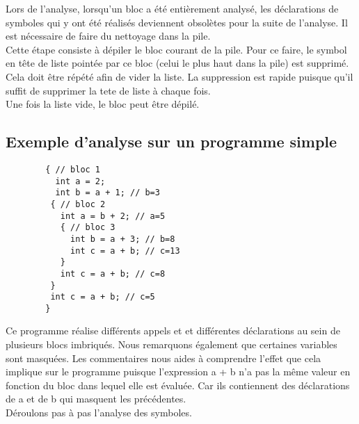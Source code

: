 \documentclass{../../res/univ-projet}
\begin{document}
      Lors de l'analyse, lorsqu'un bloc a été entièrement analysé, les déclarations de symboles qui y ont été réalisés deviennent obsolètes pour la suite de l'analyse. Il est nécessaire de faire du nettoyage dans la pile.\\

      Cette étape consiste à dépiler le bloc courant de la pile. Pour ce faire, le symbol en tête de liste pointée par ce bloc (celui le plus haut dans la pile) est supprimé. Cela doit être répété afin de vider la liste. La suppression est rapide puisque qu'il suffit de supprimer la tete de liste à chaque fois.\\
      Une fois la liste vide, le bloc peut être dépilé.

  \subsection{Exemple d'analyse sur un programme simple}
    \begin{multicols}{2}
        
        \begin{verbatim}
        { // bloc 1
          int a = 2;
          int b = a + 1; // b=3
         { // bloc 2
           int a = b + 2; // a=5
           { // bloc 3
             int b = a + 3; // b=8
             int c = a + b; // c=13
           }
           int c = a + b; // c=8
         }
         int c = a + b; // c=5
        }

        \end{verbatim}

      \columnbreak
        Ce programme réalise différents appels et et différentes déclarations au sein de plusieurs blocs imbriqués. Nous remarquons également que certaines variables sont masquées. Les commentaires nous aides à comprendre l'effet que cela implique sur le programme puisque l'expression a + b n'a pas la même valeur en fonction du bloc dans lequel elle est évaluée. Car ils contiennent des déclarations de a et de b qui masquent les précédentes.\\

        Déroulons pas à pas l'analyse des symboles.
       
    \end{multicols}
\end{document}
